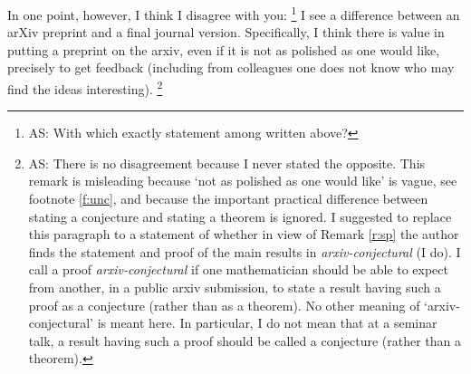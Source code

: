 \documentclass[12pt]{article}
\theoremstyle{plain}
\theoremstyle{definition}
\begin{document}
{In one point, however, I think I disagree with you:
\footnote{AS: With which exactly statement among written above? }
I see a difference between an arXiv preprint and a final journal version.
Specifically, I think there is value in putting a preprint on the arxiv, even if it is not as polished as one would like, precisely
to get feedback (including from colleagues one does not know who may find the ideas interesting).
\footnote{AS: There is no disagreement because I never stated the opposite.
This remark is misleading because `not as polished as one would like' is vague, see footnote \ref{f:unc},
and because the important practical difference between stating a conjecture and stating a theorem is ignored.
I suggested to replace this paragraph to a statement of whether in view of Remark \ref{r:sp} the author finds
the statement and proof of the main results in \cite{MW16} {\it arxiv-conjectural} (I do).
I call a proof {\it arxiv-conjectural} if one mathematician should be able to expect from another, in a public
arxiv submission, to state a result having such a proof as a conjecture (rather than as a theorem).
No other meaning of `arxiv-conjectural' is meant here.
In particular, I do not mean that at a seminar talk, a result having such a proof should be called a conjecture
(rather than a theorem).}



}
\end{document}
